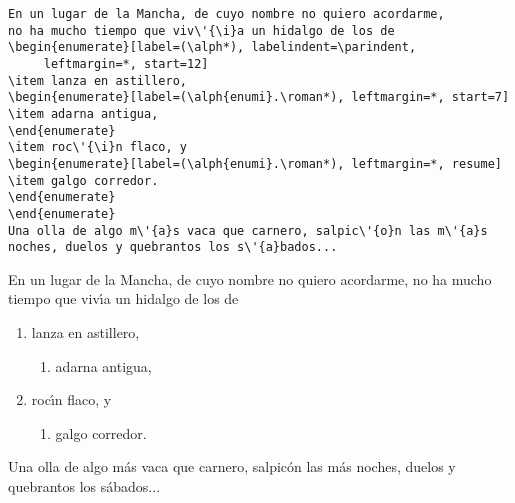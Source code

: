 \documentclass[a4paper]{ltxguide}
\begin{document}
\begin{enumerate}[leftmargin=*]
\begin{enumerate}[leftmargin=\parindent]
\begin{enumerate}[labelindent=\parindent,|\allowbreak
| leftmargin=*,|\allowbreak| label=\Roman*.,|\allowbreak
| widest=III,|\allowbreak| align=left]
\begin{enumerate}[label=\fbox{\arabic*}]
\begin{verbatim}
En un lugar de la Mancha, de cuyo nombre no quiero acordarme,
no ha mucho tiempo que viv\'{\i}a un hidalgo de los de
\begin{enumerate}[label=(\alph*), labelindent=\parindent,
     leftmargin=*, start=12]
\item lanza en astillero,
\begin{enumerate}[label=(\alph{enumi}.\roman*), leftmargin=*, start=7]
\item adarna antigua,
\end{enumerate}
\item roc\'{\i}n flaco, y
\begin{enumerate}[label=(\alph{enumi}.\roman*), leftmargin=*, resume]
\item galgo corredor.
\end{enumerate}
\end{enumerate}
Una olla de algo m\'{a}s vaca que carnero, salpic\'{o}n las m\'{a}s
noches, duelos y quebrantos los s\'{a}bados...
\end{verbatim}

En un lugar de la Mancha, de cuyo nombre no quiero acordarme,
no ha mucho tiempo que viv\'{\i}a un hidalgo de los de
\begin{enumerate}[label=(\alph*), labelindent=\parindent,
     leftmargin=*, start=12]
\item lanza en astillero,
\begin{enumerate}[label=(\alph{enumi}.\roman*), leftmargin=*, start=7]
\item adarna antigua,
\end{enumerate}
\item roc\'{\i}n flaco, y
\begin{enumerate}[label=(\alph{enumi}.\roman*), leftmargin=*, resume]
\item galgo corredor.
\end{enumerate}
\end{enumerate}
Una olla de algo m\'{a}s vaca que carnero, salpic\'{o}n las m\'{a}s
noches, duelos y quebrantos los s\'{a}bados...

\newsample


\end{enumerate}
\end{enumerate}
\end{enumerate}
\end{enumerate}
\end{document}
